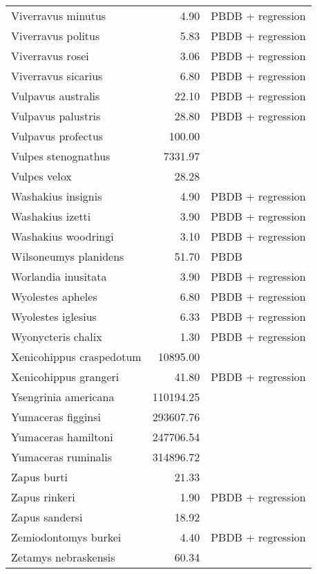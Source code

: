 \begin{table}[ht]
\begin{tabular}{lrl}
  Viverravus minutus & 4.90 & PBDB + regression \\ 
  Viverravus politus & 5.83 & PBDB + regression \\ 
  Viverravus rosei & 3.06 & PBDB + regression \\ 
  Viverravus sicarius & 6.80 & PBDB + regression \\ 
  Vulpavus australis & 22.10 & PBDB + regression \\ 
  Vulpavus palustris & 28.80 & PBDB + regression \\ 
  Vulpavus profectus & 100.00 & \cite{Williamson2013} \\ 
  Vulpes stenognathus & 7331.97 & \cite{Tomiya2013} \\ 
  Vulpes velox & 28.28 & \cite{Smith2004} \\ 
  Washakius insignis & 4.90 & PBDB + regression \\ 
  Washakius izetti & 3.90 & PBDB + regression \\ 
  Washakius woodringi & 3.10 & PBDB + regression \\ 
  Wilsoneumys planidens & 51.70 & PBDB \\ 
  Worlandia inusitata & 3.90 & PBDB + regression \\ 
  Wyolestes apheles & 6.80 & PBDB + regression \\ 
  Wyolestes iglesius & 6.33 & PBDB + regression \\ 
  Wyonycteris chalix & 1.30 & PBDB + regression \\ 
  Xenicohippus craspedotum & 10895.00 & \cite{McKenna2011} \\ 
  Xenicohippus grangeri & 41.80 & PBDB + regression \\ 
  Ysengrinia americana & 110194.25 & \cite{Tomiya2013} \\ 
  Yumaceras figginsi & 293607.76 & \cite{Tomiya2013} \\ 
  Yumaceras hamiltoni & 247706.54 & \cite{Tomiya2013} \\ 
  Yumaceras ruminalis & 314896.72 & \cite{Tomiya2013} \\ 
  Zapus burti & 21.33 & \cite{Tomiya2013} \\ 
  Zapus rinkeri & 1.90 & PBDB + regression \\ 
  Zapus sandersi & 18.92 & \cite{Tomiya2013} \\ 
  Zemiodontomys burkei & 4.40 & PBDB + regression \\ 
  Zetamys nebraskensis & 60.34 & \cite{Tomiya2013} \\ 
   \hline
\end{tabular}
\label{tab:mass_data}
\end{table}
